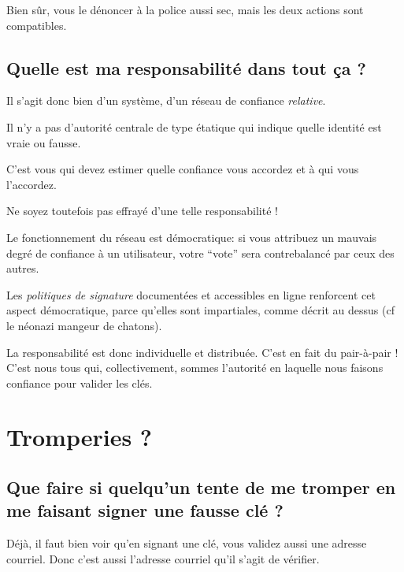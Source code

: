 
Bien sûr, vous le dénoncer à la police aussi sec, mais les deux actions
sont compatibles.

\subsection{Quelle est ma responsabilité dans tout ça ?}\label{quelle-est-ma-responsabilituxe9-dans-tout-uxe7a}

Il s'agit donc bien d'un système, d'un réseau de confiance
\emph{relative}.

Il n'y a pas d'autorité centrale de type étatique qui indique quelle
identité est vraie ou fausse.

C'est vous qui devez estimer quelle confiance vous accordez et à qui
vous l'accordez.

Ne soyez toutefois pas effrayé d'une telle responsabilité !

Le fonctionnement du réseau est démocratique: si vous attribuez un
mauvais degré de confiance à un utilisateur, votre ``vote'' sera
contrebalancé par ceux des autres.

Les \emph{politiques de signature} documentées et accessibles en ligne
renforcent cet aspect démocratique, parce qu'elles sont impartiales,
comme décrit au dessus (cf le néonazi mangeur de chatons).


La responsabilité est donc individuelle et distribuée. C'est en fait du
pair-à-pair ! C'est nous tous qui, collectivement, sommes l'autorité en
laquelle nous faisons confiance pour valider les clés.

\section{Tromperies ?}\label{tromperies}

\subsection{Que faire si quelqu'un tente de me tromper en me faisant
signer une fausse clé
?}\label{que-faire-si-quelquun-tente-de-me-tromper-en-me-faisant-signer-une-fausse-cluxe9}

Déjà, il faut bien voir qu'en signant une clé, vous validez aussi une
adresse courriel. Donc c'est aussi l'adresse courriel qu'il s'agit de
vérifier.

